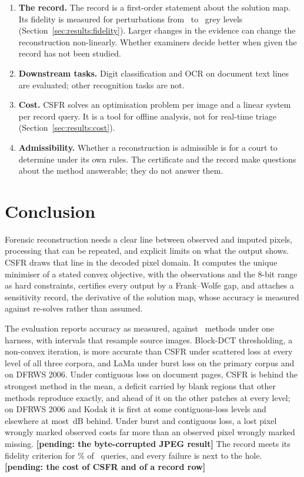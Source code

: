 \documentclass[final,3p]{elsarticle}
\newcommand{\resultpending}[1]{\textbf{[pending: #1]}}
\begin{document}
\begin{enumerate}
  \item \textbf{The record.} The record is a first-order statement about the solution map. Its fidelity is measured for perturbations from \recDeltaMin\ to \recDeltaMax\ grey levels (Section~\ref{sec:results:fidelity}). Larger changes in the evidence can change the reconstruction non-linearly. Whether examiners decide better when given the record has not been studied.
  \item \textbf{Downstream tasks.} Digit classification and OCR on document text lines are evaluated; other recognition tasks are not.
  \item \textbf{Cost.} CSFR solves an optimisation problem per image and a linear system per record query. It is a tool for offline analysis, not for real-time triage (Section~\ref{sec:results:cost}).
  \item \textbf{Admissibility.} Whether a reconstruction is admissible is for a court to determine under its own rules. The certificate and the record make questions about the method answerable; they do not answer them.
\end{enumerate}

\section{Conclusion}
\label{sec:conclusion}

Forensic reconstruction needs a clear line between observed and imputed pixels, processing that can be repeated, and explicit limits on what the output shows. CSFR draws that line in the decoded pixel domain. It computes the unique minimiser of a stated convex objective, with the observations and the 8-bit range as hard constraints, certifies every output by a Frank--Wolfe gap, and attaches a sensitivity record, the derivative of the solution map, whose accuracy is measured against re-solves rather than assumed.

The evaluation reports accuracy as measured, against \methodsTotal\ methods under one harness, with intervals that resample source images. Block-DCT thresholding, a non-convex iteration, is more accurate than CSFR under scattered loss at every level of all three corpora, and LaMa under burst loss on the primary corpus and on DFRWS 2006. Under contiguous loss on document pages, CSFR is behind the strongest method in the mean, a deficit carried by blank regions that other methods reproduce exactly, and ahead of it on the other patches at every level; on DFRWS 2006 and Kodak it is first at some contiguous-loss levels and elsewhere at most \qDfrwsCFthreeBehindMax\,dB behind. Under burst and contiguous loss, a lost pixel wrongly marked observed costs far more than an observed pixel wrongly marked missing. \resultpending{the byte-corrupted JPEG result} The record meets its fidelity criterion for \recSrfPooled\% of \recNQueries\ queries, and every failure is next to the hole. \resultpending{the cost of CSFR and of a record row}
\end{document}
